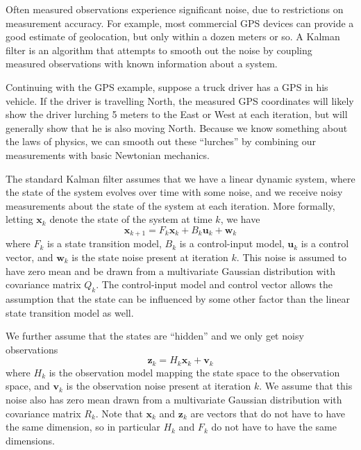 
Often measured observations experience significant noise, due to restrictions on measurement accuracy. For example, most commercial GPS devices can provide a good estimate of geolocation, but only within a dozen meters or so. A Kalman filter is an algorithm that attempts to smooth out the noise by coupling measured observations with known information about a system. 

Continuing with the GPS example, suppose a truck driver has a GPS in his vehicle. If the driver is travelling North, the measured GPS coordinates will likely show the driver lurching 5 meters to the East or West at each iteration, but will generally show that he is also moving North. Because we know something about the laws of physics, we can smooth out these ``lurches'' by combining our measurements with basic Newtonian mechanics.

The standard Kalman filter assumes that we have a linear dynamic system, where the state of the system evolves over time with some noise, and we receive noisy measurements about the state of the system at each iteration. More formally, letting $\mathbf{x}_{k}$ denote the state of the system at time $k$, we have
\begin{equation*}
\mathbf{x}_{k+1} = F_{k} \mathbf{x}_{k} + B_{k}\mathbf{u}_{k} + \mathbf{w}_{k}
\end{equation*}
where $F_{k}$ is a state transition model, $B_{k}$ is a control-input model, $\mathbf{u}_{k}$ is a control vector, and $\mathbf{w}_{k}$ is the state noise present at iteration $k$. This noise is assumed to have zero mean and be drawn from a multivariate Gaussian distribution with covariance matrix $Q_{k}$. The control-input model and control vector allows the assumption that the state can be influenced by some other factor than the linear state transition model as well.

We further assume that the states are ``hidden'' and we only get noisy observations 
\begin{equation*}
\mathbf{z}_{k} = H_{k}\mathbf{x}_{k} + \mathbf{v}_{k}
\end{equation*}
where $H_{k}$ is the observation model mapping the state space to the observation space, and $\mathbf{v}_{k}$ is the observation noise present at iteration $k$. We assume that this noise also has zero mean drawn from a multivariate Gaussian distribution with covariance matrix $R_{k}$. Note that $\mathbf{x}_{k}$ and $\mathbf{z}_{k}$ are vectors that do not have to have the same dimension, so in particular $H_{k}$ and $F_{k}$ do not have to have the same dimensions.

